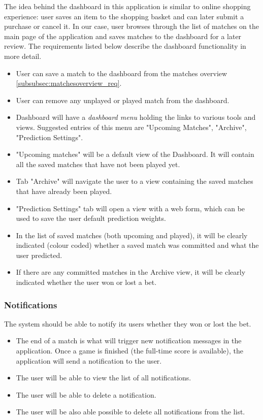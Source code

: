 The idea behind the dashboard in this application is similar to online shopping experience: user saves an item to the shopping basket and can later submit a purchase or cancel it. In our case, user browses through the list of matches on the main page of the application and saves matches to the dashboard for a later review. The requirements listed below describe the dashboard functionality in more detail.

\begin{itemize}
   \item User can save a match to the dashboard from the matches overview  \ref{subsubsec:matchesoverview_req}.
   \item User can remove any unplayed or played match from the dashboard.
   \item Dashboard will have a \emph{dashboard menu} holding the links to various tools and views. Suggested entries of this menu are "Upcoming Matches", "Archive", "Prediction Settings".
   \item "Upcoming matches" will be a default view of the Dashboard. It will contain all the saved matches that have not been played yet.
   \item Tab "Archive" will navigate the user to a view containing the saved matches that have already been played.
   \item "Prediction Settings" tab will open a view with a web form, which can be used to save the user default prediction weights.
   \item In the list of saved matches (both upcoming and played), it will be clearly indicated (colour coded) whether a saved match was committed and what the user predicted.
   \item If there are any committed matches in the Archive view, it will be clearly indicated whether the user won or lost a bet.
\end{itemize}

\subsubsection{Notifications}
\label{subsubsec:notifications_req}
The system should be able to notify its users whether they won or lost the bet.
\begin{itemize}
   \item The end of a match is what will trigger new notification messages in the application. Once a game is finished (the full-time score is available), the application will send a notification to the user.
   \item The user will be able to view the list of all notifications.
   \item The user will be able to delete a notification.
   \item The user will be also able possible to delete all notifications from the list.
\end{itemize}

